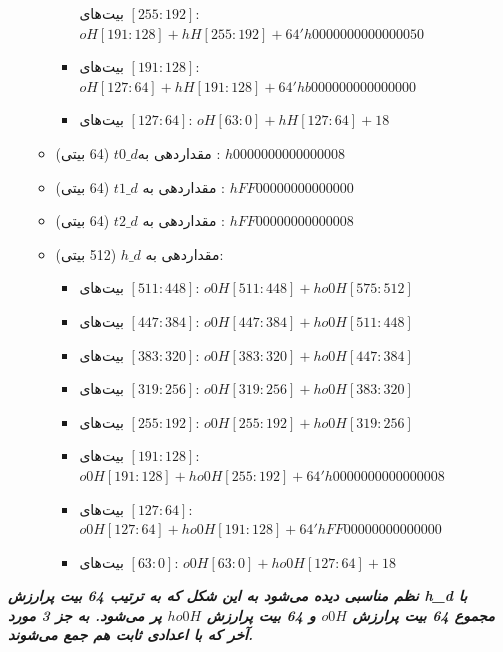 \begin{itemize}
\begin{itemize}
\begin{itemize}
	      	      	      بیت‌های $[255:192]$:
	      	      	      $	oH[191:128] + hH[255:192] + 
	      	      	      64'h0000000000000050$
	      	      	\item
	      	      	      بیت‌های $[191:128]$:	
	      	      	      $oH[127: 64] + hH[191:128] + 64'hb000000000000000$
	      	      	\item
	      	      	      بیت‌های $[127:64]$:
	      	      	  $    	oH[ 63:  0] + hH[127: 64] + 18$
	      	      \end{itemize}
	      	\item
	      	      مقداردهی به$ t0\_d$ (64 بیتی) : $h0000000000000008$
	      	\item
	      	      مقداردهی به $t1\_d$ (64 بیتی) : $hFF00000000000000$
	      	\item
	      	      مقداردهی به $t2\_d$ (64 بیتی) : $hFF00000000000008$
	      	\item
	      	      مقداردهی به $h\_d$ (512 بیتی):
	      	      \begin{itemize}
	      	      	\item
	      	      	      بیت‌های $[511:448]$:
	      	      	      $ 	o0H[511:448] + ho0H[575:512]$
      	      	    \item
	      	      	      بیت‌های $[447:384]$:  
	      	      	      	$o0H[447:384] + ho0H[511:448]$
	      	      	\item
	      	      	      بیت‌های $[383:320]$:
	      	      	      $	o0H[383:320] + ho0H[447:384]$
	      	      	\item
	      	      	      بیت‌های $[319:256]$:
	      	      	      $	o0H[319:256] + ho0H[383:320]$
	      	      	\item
	      	      	      بیت‌های $[255:192]$:
	      	      	      $	o0H[255:192] + ho0H[319:256]$
	      	      	\item
	      	      	      بیت‌های $[191:128]$:	
	      	      	      $o0H[191:128] + ho0H[255:192] + 64'h0000000000000008$
	      	      	\item
	      	      	      بیت‌های $[127:64]$:	
	      	      	      $o0H[127: 64] + ho0H[191:128] + 64'hFF00000000000000$
	      	      	\item
	      	      	      بیت‌های $[63:0]$:	
	      	      	      $	o0H[ 63:  0] + ho0H[127: 64] + 18$
	      	      	 
	      	      \end{itemize}
	      \end{itemize}
\end{itemize}
\textit{
	\textbf{نظم مناسبی دیده می‌شود به این شکل که به ترتیب 64 بیت پرارزش h\_d با مجموع 64 بیت پرارزش $o0H$ و 64 بیت پرارزش $ho0H$ پر می‌شود. به جز 3 مورد آخر که با اعدادی ثابت هم جمع می‌شوند.
}}\\

